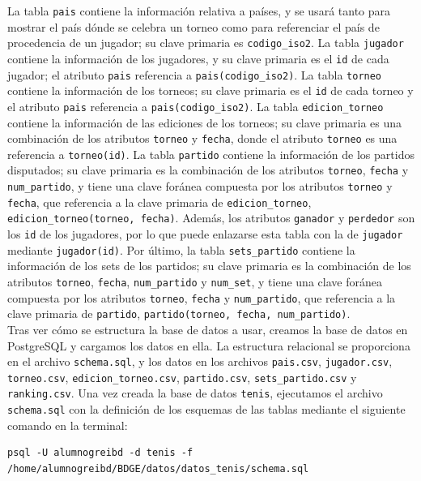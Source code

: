 La tabla \texttt{pais} contiene la información relativa a países, y se usará tanto para mostrar el país dónde se celebra un torneo como para referenciar el país de procedencia de un jugador; su clave primaria es \texttt{codigo\_iso2}. La tabla \texttt{jugador} contiene la información de los jugadores, y su clave primaria es el \texttt{id} de cada jugador; el atributo \texttt{pais} referencia a \texttt{pais(codigo\_iso2)}. La tabla \texttt{torneo} contiene la información de los torneos; su clave primaria es el \texttt{id} de cada torneo y el atributo \texttt{pais} referencia a \texttt{pais(codigo\_iso2)}. La tabla \texttt{edicion\_torneo} contiene la información de las ediciones de los torneos; su clave primaria es una combinación de los atributos \texttt{torneo} y \texttt{fecha}, donde el atributo \texttt{torneo} es una referencia a \texttt{torneo(id)}. La tabla \texttt{partido} contiene la información de los partidos disputados; su clave primaria es la combinación de los atributos \texttt{torneo}, \texttt{fecha} y \texttt{num\_partido}, y tiene una clave foránea compuesta por los atributos \texttt{torneo} y \texttt{fecha}, que referencia a la clave primaria de \texttt{edicion\_torneo}, \texttt{edicion\_torneo(torneo, fecha)}. Además, los atributos \texttt{ganador} y \texttt{perdedor} son los \texttt{id} de los jugadores, por lo que puede enlazarse esta tabla con la de \texttt{jugador} mediante \texttt{jugador(id)}. Por último, la tabla \texttt{sets\_partido} contiene la información de los sets de los partidos; su clave primaria es la combinación de los atributos \texttt{torneo}, \texttt{fecha}, \texttt{num\_partido} y \texttt{num\_set}, y tiene una clave foránea compuesta por los atributos \texttt{torneo}, \texttt{fecha} y \texttt{num\_partido}, que referencia a la clave primaria de \texttt{partido}, \texttt{partido(torneo, fecha, num\_partido)}. \\

Tras ver cómo se estructura la base de datos a usar, creamos la base de datos en PostgreSQL y cargamos los datos en ella. La estructura relacional se proporciona en el archivo \texttt{schema.sql}, y los datos en los archivos \texttt{pais.csv}, \texttt{jugador.csv}, \texttt{torneo.csv}, \texttt{edicion\_torneo.csv}, \texttt{partido.csv}, \texttt{sets\_partido.csv} y \texttt{ranking.csv}. Una vez creada la base de datos \texttt{tenis}, ejecutamos el archivo \texttt{schema.sql} con la definición de los esquemas de las tablas mediante el siguiente comando en la terminal:

\begin{lstlisting}[style=terminal]
psql -U alumnogreibd -d tenis -f /home/alumnogreibd/BDGE/datos/datos_tenis/schema.sql
\end{lstlisting}

